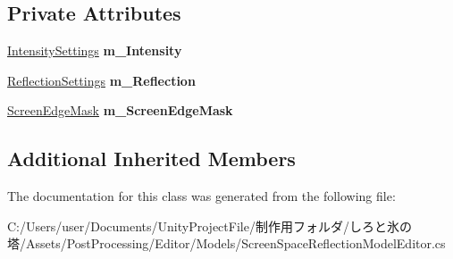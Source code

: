 \subsection*{Private Attributes}
\begin{DoxyCompactItemize}
\item 
\mbox{\label{class_unity_editor_1_1_post_processing_1_1_screen_space_reflection_model_editor_a0f387dac15ee3977afca7d7689021a3b}} 
\hyperlink{struct_unity_editor_1_1_post_processing_1_1_screen_space_reflection_model_editor_1_1_intensity_settings}{Intensity\+Settings} {\bfseries m\+\_\+\+Intensity}
\item 
\mbox{\label{class_unity_editor_1_1_post_processing_1_1_screen_space_reflection_model_editor_a4863e5e1ed2265ec1d455bae8639ee9c}} 
\hyperlink{struct_unity_editor_1_1_post_processing_1_1_screen_space_reflection_model_editor_1_1_reflection_settings}{Reflection\+Settings} {\bfseries m\+\_\+\+Reflection}
\item 
\mbox{\label{class_unity_editor_1_1_post_processing_1_1_screen_space_reflection_model_editor_a33845a6d430ae0bf10a6477769a952a6}} 
\hyperlink{struct_unity_editor_1_1_post_processing_1_1_screen_space_reflection_model_editor_1_1_screen_edge_mask}{Screen\+Edge\+Mask} {\bfseries m\+\_\+\+Screen\+Edge\+Mask}
\end{DoxyCompactItemize}
\subsection*{Additional Inherited Members}


The documentation for this class was generated from the following file\+:\begin{DoxyCompactItemize}
\item 
C\+:/\+Users/user/\+Documents/\+Unity\+Project\+File/制作用フォルダ/しろと氷の塔/\+Assets/\+Post\+Processing/\+Editor/\+Models/Screen\+Space\+Reflection\+Model\+Editor.\+cs\end{DoxyCompactItemize}
